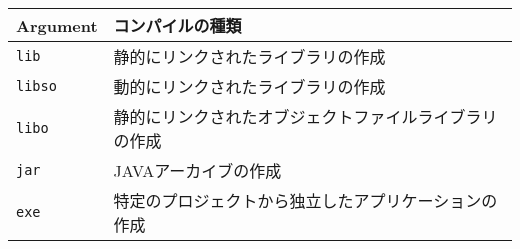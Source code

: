 \begin{tabular}{ll}
 Argument & コンパイルの種類 \\
 \hline
 \tblstrut
 \texttt{lib} & 静的にリンクされたライブラリの作成 \\
 \texttt{libso} & 動的にリンクされたライブラリの作成 \\
 \texttt{libo} & 静的にリンクされたオブジェクトファイルライブラリの作成 \\
 \texttt{jar} & JAVAアーカイブの作成 \\
 \texttt{exe} & 特定のプロジェクトから独立したアプリケーションの作成 \\
 \hline
\end{tabular}

